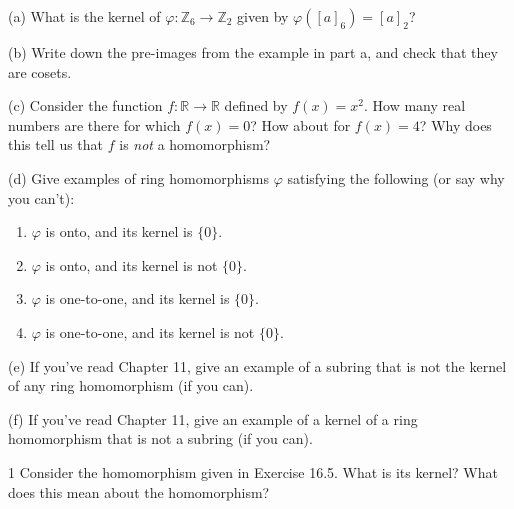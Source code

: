 \begin{problem}[Warmup]{(a)}
    What is the kernel of $\varphi : \mathbb{Z}_6 \to \mathbb{Z}_2$ given by $\varphi([a]_6) = [a]_2$?
\end{problem}
\unsolved

\begin{problem}[Warmup]{(b)}
    Write down the pre-images from the example in part a, and check that they are cosets.
\end{problem}
\unsolved

\begin{problem}[Warmup]{(c)}
    Consider the function $f : \mathbb{R} \to \mathbb{R}$ defined by $f(x) = x^2$. How many real numbers are there for which $f(x) = 0$? How about for $f(x) = 4$? Why does this tell us that $f$ is \emph{not} a homomorphism?
\end{problem}
\unsolved

\begin{problem}[Warmup]{(d)}
    Give examples of ring homomorphisms $\varphi$ satisfying the following (or say why you can't):
    \begin{enumerate}
        \item[(a)] $\varphi$ is onto, and its kernel is $\{0\}$.
        \item[(b)] $\varphi$ is onto, and its kernel is not $\{0\}$.
        \item[(c)] $\varphi$ is one-to-one, and its kernel is $\{0\}$.
        \item[(d)] $\varphi$ is one-to-one, and its kernel is not $\{0\}$.
    \end{enumerate}
\end{problem}
\unsolved

\begin{problem}[Warmup]{(e)}
    If you've read Chapter 11, give an example of a subring that is not the kernel of any ring homomorphism (if you can).
\end{problem}
\unsolved

\begin{problem}[Warmup]{(f)}
    If you've read Chapter 11, give an example of a kernel of a ring homomorphism that is not a subring (if you can).
\end{problem}
\unsolved

\begin{problem}{1}
    Consider the homomorphism given in Exercise 16.5. What is its kernel? What does this
    mean about the homomorphism?
\end{problem}
\unsolved

